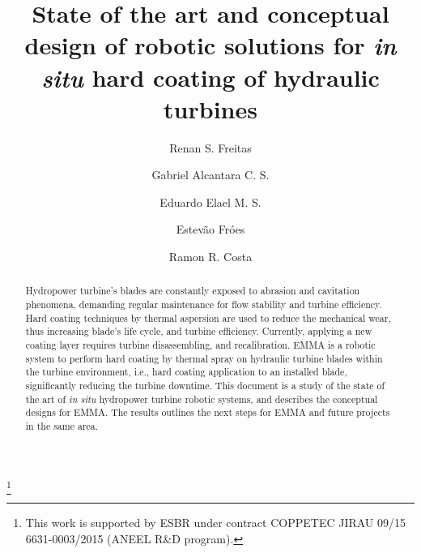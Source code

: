 \documentclass[twocolumn]{svjour3}
\begin{document}

\title{State of the art and conceptual design of robotic solutions for
\textit{in situ} hard coating of hydraulic turbines}%



\author{Renan S. Freitas \and
		Gabriel Alcantara C. S. \and
		Eduardo Elael M. S. \and
		Estevão Fróes \and
		Ramon R. Costa}


\thanks{This work is supported by ESBR under contract COPPETEC
JIRAU 09/15 6631-0003/2015 (ANEEL R\&D program).}

\maketitle
  
\begin{abstract}      
Hydropower turbine's blades are constantly exposed to abrasion and cavitation
phenomena, demanding regular maintenance for flow stability and
turbine efficiency. Hard coating techniques by thermal aspersion are used to reduce the
mechanical wear, thus increasing blade's life cycle,
and turbine efficiency. Currently, applying a new coating layer requires turbine
disassembling, and recalibration. EMMA is a robotic system
to perform hard coating by thermal spray on hydraulic turbine blades within the
turbine environment, i.e., hard coating application to an installed blade,
significantly reducing the turbine downtime.
This document is a study of the state of the art of \textit{in situ}
hydropower turbine robotic systems, and describes the conceptual designs for
EMMA. The results outlines the next steps for EMMA and future projects in the
same area.

\end{abstract} 

 





  
 
\end{document}
